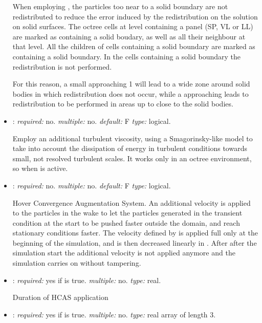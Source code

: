 \begin{itemize}
When employing , the particles too near to a solid boundary are not redistributed to reduce the error induced by the redistribution on the solution on solid surfaces. The octree cells at level  containing a panel (SP, VL or LL) are marked as containing a solid boudary, as well as all their neighbour at that level. All the children of cells containing a solid boundary are marked as containing a solid boundary. In the cells containing a solid boundary the redistribution is not performed.

For this reason, a small  approaching 1 will lead to a wide zone around solid bodies in which redistribution does not occur, while a  approaching  leads to redistribution to be performed in areas up to close to the solid bodies.

\item {}: \textit{required:} no. \textit{multiple:} no. \textit{default:} F \textit{type:} logical.

Employ an additional turbulent viscosity, using a Smagorinsky-like model to take into account the dissipation of energy in turbulent conditions towards small, not resolved turbulent scales. It works only in an octree environment, so when  is active.

\item {}: \textit{required:} no. \textit{multiple:} no. \textit{default:} F \textit{type:} logical.

Hover Convergence Augmentation System. An additional velocity is applied to the particles in the wake to let the particles generated in the transient condition at the start to be pushed faster outside the domain, and reach stationary conditions faster. The velocity defined by  is applied full only at the beginning of the simulation, and is then decreased linearly in . After  after the simulation start the additional velocity is not applied anymore and the simulation carries on without tampering. 

\item {}: \textit{required:} yes if  is true. \textit{multiple:} no. \textit{type:} real.

Duration of HCAS application

\item {}: \textit{required:} yes if  is true. \textit{multiple:} no. \textit{type:} real array of length 3.


\end{itemize}
